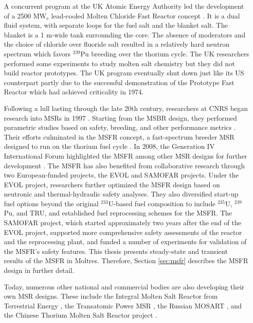 A concurrent program at the UK Atomic Energy Authority led the
development of a 2500 MW$_{\text{e}}$ lead-cooled Molten Chloride Fast Reactor
concept \cite{smith_assessment_1974}. It is a dual fluid system,
with separate loops for the fuel salt and the blanket salt. The blanket is a
1 m-wide tank surrounding the core. The absence of moderators and the choice
of chloride over fluoride salt resulted in a relatively hard neutron spectrum
which favors $^{239}$Pu breeding over the thorium cycle. The UK researchers
performed some experiments to study molten salt chemistry but they did not
build reactor prototypes. The UK program eventually shut down just like its
US counterpart partly due to the successful demonstration of the Prototype
Fast Reactor which had achieved criticality in 1974.

Following a lull lasting through the late 20th century, researchers at
\gls{CNRS} began research into \glspl{MSR} in 1997
\cite{heuer_simulation_2010}. Starting from the \gls{MSBR} design, they
performed parametric studies based on safety, breeding, and
other performance metrics \cite{mathieu_thorium_2006}. Their efforts
culminated in the \gls{MSFR} concept, a fast-spectrum breeder \gls{MSR}
designed to run on the thorium fuel cycle \cite{merle_optimized_2007}. In
2008, the Generation IV International Forum highlighted the \gls{MSFR} among
other \gls{MSR} designs for further development \cite{gif_generation_2008}.
The \gls{MSFR} has also benefited from collaborative research through two
European-funded projects, the \gls{EVOL} \cite{euratom_final_2015} and
\gls{SAMOFAR} \cite{kloosterman_20_2017} projects. Under the \gls{EVOL}
project, researchers further optimized the \gls{MSFR} design based on
neutronic and thermal-hydraulic safety analyses. They also diversified
start-up fuel options beyond the original $^{233}$U-based fuel composition to
include $^{235}$U, $^{239}$Pu, and \gls{TRU}, and established fuel
reprocessing schemes for the \gls{MSFR}. The \gls{SAMOFAR} project, which
started approximately two years after the end of the \gls{EVOL} project,
supported more comprehensive safety assessments of the reactor and the
reprocessing plant, and funded a number of experiments for validation of the
\gls{MSFR}'s safety features. This thesis presents steady-state and
transient results of the \gls{MSFR} in Moltres. Therefore, Section
\ref{sec:msfr} describes the \gls{MSFR} design in further detail.

Today, numerous other national and commercial
bodies are also developing their own \gls{MSR} designs. These include the
Integral Molten Salt Reactor from Terrestrial Energy
\cite{leblanc_integral_2015}, the Transatomic Power \gls{MSR}
\cite{transatomic_power_corporation_technical_2016}, the Russian \gls{MOSART}
\cite{ignatiev_molten_2014}, and the Chinese Thorium Molten Salt Reactor
project \cite{zhang_review_2018}.

